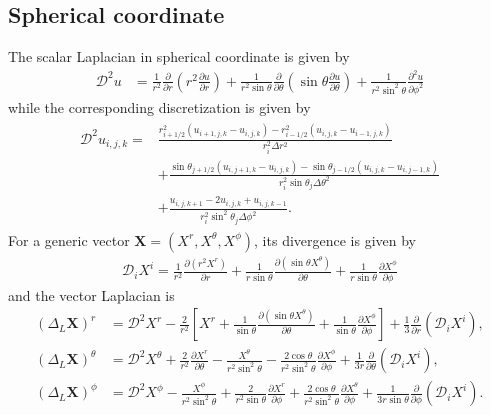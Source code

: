 \subsection{Spherical coordinate}
The scalar Laplacian in spherical coordinate is given by
\begin{align}
    \mathcal{D}^2 u &= \frac{1}{r^2} \frac{\partial}{\partial r} \left( r^2 \frac{\partial u}{\partial r} \right)
        + \frac{1}{r^2 \sin{\theta}} \frac{\partial}{\partial \theta} \left( \sin{\theta} \frac{\partial u}{\partial \theta} \right) 
        + \frac{1}{r^2 \sin^2{\theta}} \frac{\partial^2 u}{\partial \phi^2}
\end{align}
while the corresponding discretization is given by
\begin{align}
\begin{split}
    \mathcal{D}^2 u_{i,j,k} =& \frac{r_{i+1/2}^2 \left(u_{i+1,j,k} - u_{i,j,k} \right)
            - r_{i-1/2}^2 \left(u_{i,j,k} - u_{i-1,j,k} \right)}{r_i^2 \Delta r^2} \\
            &+ \frac{ \sin{\theta_{j+1/2}} \left(u_{i,j+1,k} - u_{i,j,k} \right)
            - \sin{\theta_{j-1/2}} \left(u_{i,j,k} - u_{i,j-1,k} \right)}{r_i^2 \sin{\theta_j} \Delta \theta^2} \\
            &+ \frac{ u_{i,j,k+1} - 2 u_{i,j,k} + u_{i,j,k-1}}{r_i^2 \sin^2{\theta_j}\Delta \phi^2}.
\end{split}
\end{align}
For a generic vector $\mathbf{X} = \left(X^r, X^\theta, X^\phi \right)$, its divergence is given by
\begin{align}
    \mathcal{D}_i X^i = \frac{1}{r^2} \frac{\partial \left(r^2 X^r\right)}{\partial r} 
            + \frac{1}{r\sin\theta}\frac{\partial \left(\sin\theta X^\theta\right)}{\partial \theta}
            + \frac{1}{r\sin\theta}\frac{\partial X^\phi}{\partial \phi}
\end{align}
and the vector Laplacian is
\begin{align}
    \left(\Delta_L \mathbf{X}\right)^r &= \mathcal{D}^2 X^r 
            - \frac{2}{r^2}\left[ X^r + \frac{1}{\sin\theta}\frac{\partial \left(\sin\theta X^\theta\right)}{\partial \theta} 
            + \frac{1}{\sin\theta} \frac{\partial X^\phi}{\partial \phi}\right]
            + \frac{1}{3}\frac{\partial}{\partial r}\left( \mathcal{D}_i X^i \right), \\
    \left(\Delta_L \mathbf{X}\right)^\theta &= \mathcal{D}^2 X^\theta 
            + \frac{2}{r^2}\frac{\partial X^r}{\partial \theta} - \frac{X^\theta}{r^2 \sin^2\theta}
            - \frac{2 \cos\theta}{r^2\sin^2\theta}\frac{\partial X^\phi}{\partial \phi}
            + \frac{1}{3 r}\frac{\partial}{\partial \theta}\left( \mathcal{D}_i X^i \right), \\
    \left(\Delta_L \mathbf{X}\right)^\phi &= \mathcal{D}^2 X^\phi 
            - \frac{X^\phi}{r^2 \sin^2\theta} + \frac{2}{r^2\sin\theta}\frac{\partial X^r}{\partial \phi}
            + \frac{2 \cos\theta}{r^2\sin^2\theta}\frac{\partial X^\theta}{\partial \phi}
            + \frac{1}{3 r\sin\theta}\frac{\partial}{\partial \phi}\left( \mathcal{D}_i X^i \right).
\end{align}

